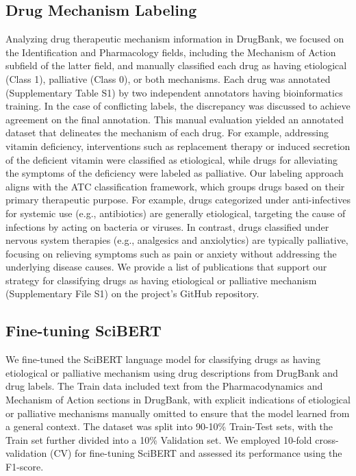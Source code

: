 \documentclass[journal,twoside,web]{ieeecolor}
\begin{document}
\subsection{Drug Mechanism Labeling}
\label{sec:annotation}
Analyzing drug therapeutic mechanism information in DrugBank, we focused on the Identification and Pharmacology fields, including the Mechanism of Action subfield of the latter field, and manually classified each drug as having etiological (Class 1), palliative (Class 0), or both mechanisms. 
Each drug was annotated (Supplementary Table S1) by two independent annotators having bioinformatics training. 
In the case of conflicting labels, the discrepancy was discussed to achieve agreement on the final annotation.
This manual evaluation yielded an annotated dataset that delineates the mechanism of each drug.
For example, addressing vitamin deficiency, interventions such as replacement therapy or induced secretion of the deficient vitamin were classified as etiological, while drugs for alleviating the symptoms of the deficiency were labeled as palliative.
Our labeling approach aligns with the ATC classification framework, which groups drugs based on their primary therapeutic purpose. For example, drugs categorized under anti-infectives for systemic use (e.g., antibiotics) are generally etiological, targeting the cause of infections by acting on bacteria or viruses. In contrast, drugs classified under nervous system therapies (e.g., analgesics and anxiolytics) are typically palliative, focusing on relieving symptoms such as pain or anxiety without addressing the underlying disease causes.
We provide a list of publications that support our strategy for classifying drugs as having etiological or palliative mechanism (Supplementary File S1) on the project’s GitHub repository.

\subsection{Fine-tuning SciBERT}
\label{sec:SciBERT}
We fine-tuned the SciBERT language model \cite{beltagy2019scibert} for classifying drugs as having etiological or palliative mechanism using drug descriptions from DrugBank and drug labels.
The Train data included text from the Pharmacodynamics and Mechanism of Action sections in DrugBank, with explicit indications of etiological or palliative mechanisms manually omitted to ensure that the model learned from a general context. 
The dataset was split into 90-10\% Train-Test sets, with the Train set further divided into a 10\% Validation set. 
We employed 10-fold cross-validation (CV) for fine-tuning SciBERT and assessed its performance using the F1-score.
\end{document}
